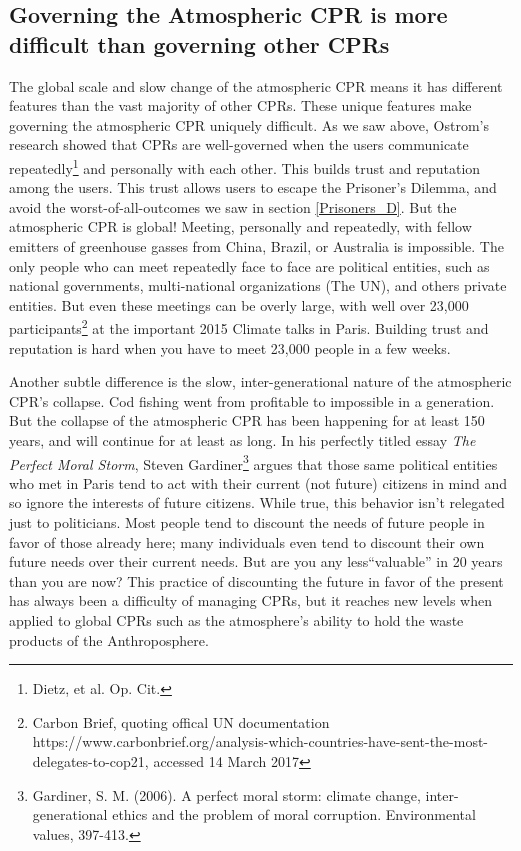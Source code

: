 \subsection{Governing the Atmospheric CPR is more difficult than governing other CPRs}
The global scale and slow change of the atmospheric CPR means it has different features than the vast majority of other CPRs. These unique features make governing the atmospheric CPR uniquely difficult. As we saw above, Ostrom's research showed that CPRs are well-governed when the users communicate repeatedly\footnote{Dietz,  et al. Op. Cit.} and personally with each other. This builds trust and reputation among the users. This trust allows users to escape the Prisoner's Dilemma, and avoid the worst-of-all-outcomes we saw in section \ref{Prisoners_D}. But the atmospheric CPR is global! Meeting, personally and repeatedly, with fellow emitters of greenhouse gasses from China, Brazil, or Australia is impossible. The only people who can meet repeatedly face to face are political entities, such as national governments, multi-national organizations (The UN), and others private entities. But even these meetings can be overly large, with well over 23,000 participants\footnote{Carbon Brief, quoting offical UN documentation https://www.carbonbrief.org/analysis-which-countries-have-sent-the-most-delegates-to-cop21, accessed 14 March 2017} at the important 2015 Climate talks in Paris. Building trust and reputation is hard when you have to meet 23,000 people in a few weeks.  

Another subtle difference is the slow, inter-generational nature of the atmospheric CPR's collapse. Cod fishing went from profitable to impossible in a generation. But the collapse of the atmospheric CPR has been happening for at least 150 years, and will continue for at least as long. In his perfectly titled essay \textit{The Perfect Moral Storm}, Steven Gardiner\footnote{Gardiner, S. M. (2006). A perfect moral storm: climate change, inter-generational ethics and the problem of moral corruption. Environmental values, 397-413.} argues that those same political entities who met in Paris tend to act with their current (not future) citizens in mind and so ignore the interests of future citizens. While true, this behavior isn't relegated just to politicians. Most people tend to discount the needs of future people in favor of those already here; many individuals even tend to discount their own future needs over their current needs. But are you any less``valuable'' in 20 years than you are now? This practice of discounting the future in favor of the present has always been a difficulty of managing CPRs, but it reaches new levels when applied to global CPRs such as the atmosphere's ability to hold the waste products of the Anthroposphere.  


